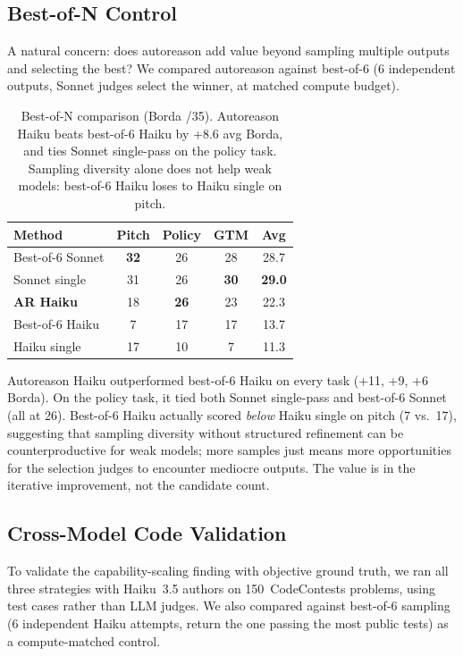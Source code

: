 \documentclass[11pt]{article}
\begin{document}
\subsection{Best-of-N Control}

A natural concern: does autoreason add value beyond sampling multiple outputs and selecting the best? We compared autoreason against best-of-6 (6 independent outputs, Sonnet judges select the winner, at matched compute budget).

\begin{table}[H]
\centering
\small
\begin{tabular}{@{}lcccc@{}}
\toprule
\textbf{Method} & \textbf{Pitch} & \textbf{Policy} & \textbf{GTM} & \textbf{Avg} \\
\midrule
\rowcolor{TableShade}
Best-of-6 Sonnet & \textbf{32} & 26 & 28 & 28.7 \\
Sonnet single & 31 & 26 & \textbf{30} & \textbf{29.0} \\
\rowcolor{TableShade}
\textbf{AR Haiku} & 18 & \textbf{26} & 23 & 22.3 \\
Best-of-6 Haiku & 7 & 17 & 17 & 13.7 \\
\rowcolor{TableShade}
Haiku single & 17 & 10 & 7 & 11.3 \\
\bottomrule
\end{tabular}
\caption{Best-of-N comparison (Borda /35). Autoreason Haiku beats best-of-6 Haiku by +8.6 avg Borda, and ties Sonnet single-pass on the policy task. Sampling diversity alone does not help weak models: best-of-6 Haiku loses to Haiku single on pitch.}
\label{tab:best_of_n}
\end{table}

Autoreason Haiku outperformed best-of-6 Haiku on every task (+11, +9, +6 Borda). On the policy task, it tied both Sonnet single-pass and best-of-6 Sonnet (all at 26). Best-of-6 Haiku actually scored \textit{below} Haiku single on pitch (7 vs.\ 17), suggesting that sampling diversity without structured refinement can be counterproductive for weak models; more samples just means more opportunities for the selection judges to encounter mediocre outputs. The value is in the iterative improvement, not the candidate count.

\subsection{Cross-Model Code Validation}

To validate the capability-scaling finding with objective ground truth, we ran all three strategies with Haiku~3.5 authors on 150~CodeContests problems, using test cases rather than LLM judges. We also compared against best-of-6 sampling (6 independent Haiku attempts, return the one passing the most public tests) as a compute-matched control.
\end{document}
